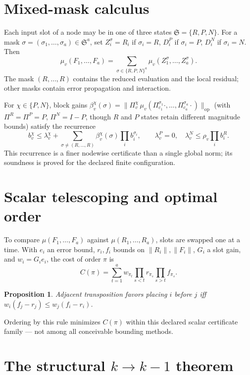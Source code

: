 \documentclass[11pt]{amsart}
\newtheorem{proposition}[theorem]{Proposition}
\theoremstyle{definition}
\theoremstyle{remark}
\DeclareMathOperator{\op}{op}
\begin{document}
\section{Mixed-mask calculus}

Each input slot of a node may be in one of three states
$\mathfrak S=\{R,P,N\}$. For a mask
$\sigma=(\sigma_1,\ldots,\sigma_a)\in\mathfrak S^a$, set
$Z_i^\sigma = R_i$ if $\sigma_i=R$, $D_i^P$ if $\sigma_i=P$, $D_i^N$ if
$\sigma_i=N$. Then
\[
\mu_v(F_1,\ldots,F_a) = \sum_{\sigma\in\{R,P,N\}^a}\mu_v(Z_1^\sigma,\ldots,Z_a^\sigma).
\]
The mask $(R,\ldots,R)$ contains the reduced evaluation and the local
residual; other masks contain error propagation and interaction.

For $\chi\in\{P,N\}$, block gains
$\beta_v^\chi(\sigma) = \lVert \Pi_v^\chi\,\mu_v(\Pi_{c_1}^{\sigma_1}\cdot,\ldots,\Pi_{c_a}^{\sigma_a}\cdot)\rVert_{\op}$
(with $\Pi^R=\Pi^P=P$, $\Pi^N=I-P$, though $R$ and $P$ states retain
different magnitude bounds) satisfy the recurrence
\[
b_v^\chi \le \lambda_v^\chi + \sum_{\sigma\neq(R,\ldots,R)}\beta_v^\chi(\sigma)\prod_i b_i^{\sigma_i},
\qquad \lambda_v^P=0,\quad \lambda_v^N\le\rho_v\prod_i b_i^R.
\]
This recurrence is a finer nodewise certificate than a single global
norm; its soundness is proved for the declared finite configuration.

\section{Scalar telescoping and optimal order}

To compare $\mu(F_1,\ldots,F_a)$ against $\mu(R_1,\ldots,R_a)$, slots
are swapped one at a time. With $e_i$ an error bound, $r_i,f_i$ bounds
on $\lVert R_i\rVert,\lVert F_i\rVert$, $G_i$ a slot gain, and
$w_i=G_ie_i$, the cost of order $\pi$ is
\[
C(\pi) = \sum_{t=1}^{a} w_{\pi_t}\prod_{s<t}r_{\pi_s}\prod_{s>t}f_{\pi_s}.
\]

\begin{proposition}
Adjacent transposition favors placing $i$ before $j$ iff
$w_i(f_j-r_j) \le w_j(f_i-r_i)$.
\end{proposition}
Ordering by this rule minimizes $C(\pi)$ within this declared scalar
certificate family — not among all conceivable bounding methods.

\section{The structural $k\to k-1$ theorem}
\label{sec:xiii}
\end{document}
